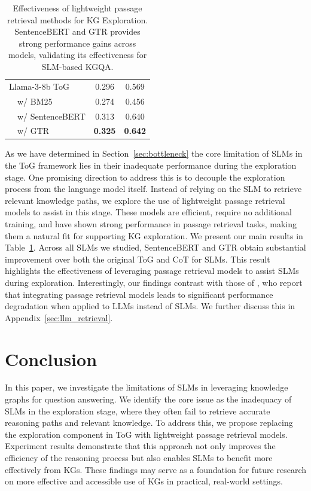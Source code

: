 \documentclass[11pt]{article}
\begin{document}
\begin{table}[ht]
\begin{tabular}{lcc}
    Llama-3-8b ToG & 0.296 & 0.569 \\
    $\quad$w/ BM25 & 0.274 & 0.456 \\
    $\quad$w/ SentenceBERT & 0.313 & 0.640 \\
    $\quad$w/ GTR & \textbf{0.325} & \textbf{0.642} \\ \bottomrule
  \end{tabular}
  \caption{Effectiveness of lightweight passage retrieval methods for KG Exploration. SentenceBERT and GTR provides strong performance gains across models, validating its effectiveness for SLM-based KGQA.}
  \label{tab:retrieval}
\end{table}

As we have determined in Section~\ref{sec:bottleneck} the core limitation of SLMs in the ToG framework lies in their inadequate performance during the exploration stage. One promising direction to address this is to decouple the exploration process from the language model itself. Instead of relying on the SLM to retrieve relevant knowledge paths, we explore the use of lightweight passage retrieval models to assist in this stage. These models are efficient, require no additional training, and have shown strong performance in passage retrieval tasks, making them a natural fit for supporting KG exploration. We present our main results in Table~\ref{tab:retrieval}. Across all SLMs we studied, SentenceBERT and GTR obtain substantial improvement over both the original ToG and CoT for SLMs. This result highlights the effectiveness of leveraging passage retrieval models to assist SLMs during exploration. Interestingly, our findings contrast with those of \citet{sun2024thinkongraph}, who report that integrating passage retrieval models leads to significant performance degradation when applied to LLMs instead of SLMs. We further discuss this in Appendix~\ref{sec:llm_retrieval}.
\section{Conclusion}
In this paper, we investigate the limitations of SLMs in leveraging knowledge graphs for question answering. We identify the core issue as the inadequacy of SLMs in the exploration stage, where they often fail to retrieve accurate reasoning paths and relevant knowledge. To address this, we propose replacing the exploration component in ToG with lightweight passage retrieval models. Experiment results demonstrate that this approach not only improves the efficiency of the reasoning process but also enables SLMs to benefit more effectively from KGs. These findings may serve as a foundation for future research on more effective and accessible use of KGs in practical, real-world settings.
\end{document}
